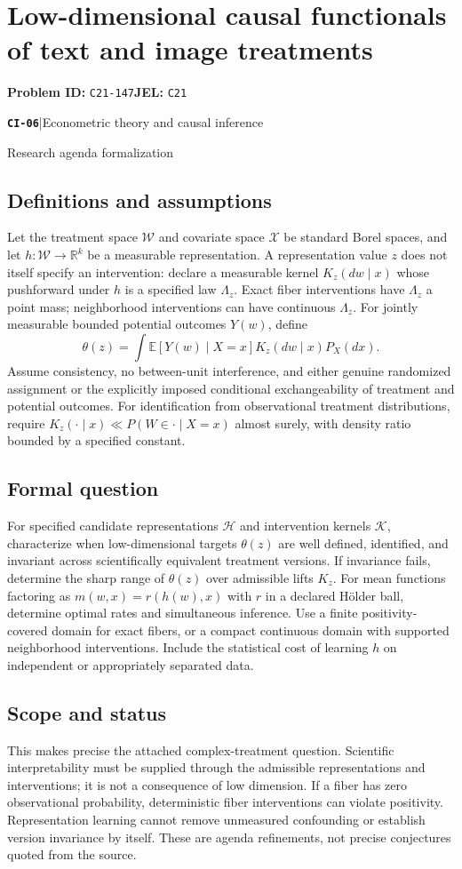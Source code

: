 \documentclass[11pt,a4paper]{article}
\newcommand{\R}{\mathbb R}
\newcommand{\E}{\mathbb E}
\newcommand{\entrymeta}[3]{{\sffamily\small\color{muted}\textbf{\texttt{#1}}\quad|\quad #2\par #3\par}}
\begin{document}
\section*{Low-dimensional causal functionals of text and image treatments}
\textbf{Problem ID:} \texttt{C21-147}\quad \textbf{JEL:} \texttt{C21}\par
\label{problem:OP-0485}
\label{beyond:CI-06}
\entrymeta{CI-06}{Econometric theory and causal inference}{Research agenda formalization}
\subsection*{Definitions and assumptions}
Let the treatment space $\mathcal W$ and covariate space $\mathcal X$ be standard Borel spaces, and let $h:\mathcal W\to\R^k$ be a measurable representation. A representation value $z$ does not itself specify an intervention: declare a measurable kernel $K_z(dw\mid x)$ whose pushforward under $h$ is a specified law $\Lambda_z$. Exact fiber interventions have $\Lambda_z$ a point mass; neighborhood interventions can have continuous $\Lambda_z$. For jointly measurable bounded potential outcomes $Y(w)$, define
\[
\theta(z)=\int\E[Y(w)\mid X=x]K_z(dw\mid x)P_X(dx).
\]
Assume consistency, no between-unit interference, and either genuine randomized assignment or the explicitly imposed conditional exchangeability of treatment and potential outcomes. For identification from observational treatment distributions, require $K_z(\cdot\mid x)\ll P(W\in\cdot\mid X=x)$ almost surely, with density ratio bounded by a specified constant.
\subsection*{Formal question}
For specified candidate representations $\mathcal H$ and intervention kernels $\mathcal K$, characterize when low-dimensional targets $\theta(z)$ are well defined, identified, and invariant across scientifically equivalent treatment versions. If invariance fails, determine the sharp range of $\theta(z)$ over admissible lifts $K_z$. For mean functions factoring as $m(w,x)=r(h(w),x)$ with $r$ in a declared Hölder ball, determine optimal rates and simultaneous inference. Use a finite positivity-covered domain for exact fibers, or a compact continuous domain with supported neighborhood interventions. Include the statistical cost of learning $h$ on independent or appropriately separated data.
\subsection*{Scope and status}
This makes precise the attached complex-treatment question. Scientific interpretability must be supplied through the admissible representations and interventions; it is not a consequence of low dimension. If a fiber has zero observational probability, deterministic fiber interventions can violate positivity. Representation learning cannot remove unmeasured confounding or establish version invariance by itself. These are agenda refinements, not precise conjectures quoted from the source.
\end{document}
